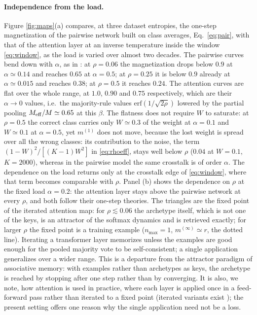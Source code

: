 \documentclass{SciPost}
\theoremstyle{plain}
\theoremstyle{definition}
\newcommand{\Meff}{M_{\rm eff}}
\newcommand{\erf}{\mathrm{erf}}
\begin{document}
\paragraph{Independence from the load.} Figure \ref{fig:maps}(a) compares, at three dataset entropies, the one-step magnetization of the pairwise network built on class averages, Eq.\ \eqref{eq:pair}, with that of the attention layer at an inverse temperature inside the window \eqref{eq:window}, as the load is varied over almost two decades. The pairwise curves bend down with $\alpha$, as in \cite{Alemanno2023}: at $\rho=0.06$ the magnetization drops below $0.9$ at $\alpha\simeq0.14$ and reaches $0.65$ at $\alpha=0.5$; at $\rho=0.25$ it is below $0.9$ already at $\alpha\simeq0.015$ and reaches $0.38$; at $\rho=0.5$ it reaches $0.24$. The attention curves are flat over the whole range, at $1.0$, $0.90$ and $0.75$ respectively, which are their $\alpha\to0$ values, i.e.\ the majority-rule values $\erf(1/\sqrt{2\rho})$ lowered by the partial pooling $\Meff/M\simeq0.65$ at this $\beta$. The flatness does not require $W$ to saturate: at $\rho=0.5$ the correct class carries only $W\simeq0.3$ of the weight at $\alpha=0.1$ and $W\simeq0.1$ at $\alpha=0.5$, yet $m^{(1)}$ does not move, because the lost weight is spread over all the wrong classes: its contribution to the noise, the term $(1-W)^2/[(K-1)W^2]$ in \eqref{eq:rhoeff}, stays well below $\rho$ ($0.04$ at $W=0.1$, $K=2000$), whereas in the pairwise model the same crosstalk is of order $\alpha$. The dependence on the load returns only at the crosstalk edge of \eqref{eq:window}, where that term becomes comparable with $\rho$. Panel (b) shows the dependence on $\rho$ at the fixed load $\alpha=0.2$: the attention layer stays above the pairwise network at every $\rho$, and both follow their one-step theories. The triangles are the fixed point of the iterated attention map: for $\rho\lesssim0.06$ the archetype itself, which is not one of the keys, is an attractor of the softmax dynamics and is retrieved exactly; for larger $\rho$ the fixed point is a training example ($n_{\max}=1$, $m^{(\infty)}\simeq r$, the dotted line). Iterating a transformer layer memorizes unless the examples are good enough for the pooled majority vote to be self-consistent; a single application generalizes over a wider range. This is a departure from the attractor paradigm of associative memory: with examples rather than archetypes as keys, the archetype is reached by stopping after one step rather than by converging. It is also, we note, how attention is used in practice, where each layer is applied once in a feed-forward pass rather than iterated to a fixed point (iterated variants exist \cite{Hoover2024}); the present setting offers one reason why the single application need not be a loss.
\end{document}
